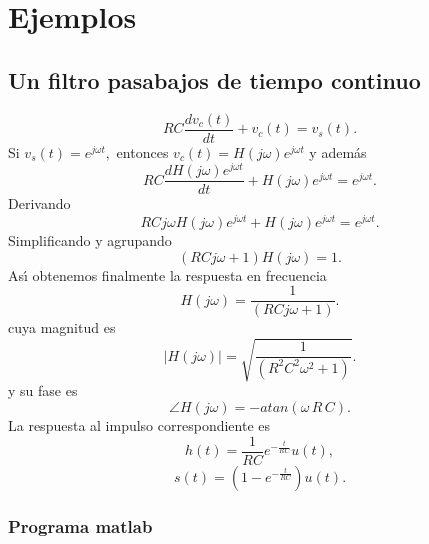 \section{Ejemplos}
\subsection{Un filtro pasabajos de tiempo continuo}

\begin{equation}
        RC\frac{dv_{c}\left( t\right) }{dt}+v_{c}\left( t\right) = v_{s}\left(t\right) .
\end{equation}
Si $v_{s}\left( t\right) =e^{j\omega t},$ entonces 
$v_{c}\left( t\right)=H\left( j\omega \right) e^{j\omega t}$ y adem\'{a}s 
\begin{equation}
RC\frac{dH\left( j\omega \right) e^{j\omega t}}{dt}+
H\left( j\omega \right)e^{j\omega t}=e^{j\omega t}.
\end{equation}
Derivando 
\begin{equation}
RCj\omega H\left( j\omega \right) e^{j\omega t}+
H\left( j\omega \right)e^{j\omega t}=e^{j\omega t}.
\end{equation}
Simplificando y agrupando 
\begin{equation}
\left( RCj\omega +1\right) H\left( j\omega \right) =1.
\end{equation}
As\'{\i} obtenemos finalmente la respuesta en frecuencia 
\begin{equation}
H\left( j\omega \right) =\frac{1}{\left( R C j\omega +1\right) }.
\end{equation}
cuya magnitud es
\begin{equation}
| H\left( j\omega \right) | = \sqrt{\frac{1}{\left( R^{2} C^{2} \omega^{2} +1\right)}}.
\end{equation}
y su fase es
\begin{equation}
\angle H\left(j \omega \right) = -atan(\omega \, R \, C).
\end{equation}
La respuesta al impulso correspondiente es
\begin{equation}
h\left( t\right) =\frac{1}{RC}e^{-\frac{t}{RC}}u\left( t\right),
\end{equation}
\begin{equation}
s\left( t\right) =\left( 1-e^{-\frac{t}{RC}}\right) u\left( t\right).
\end{equation}

\subsubsection{Programa matlab}

